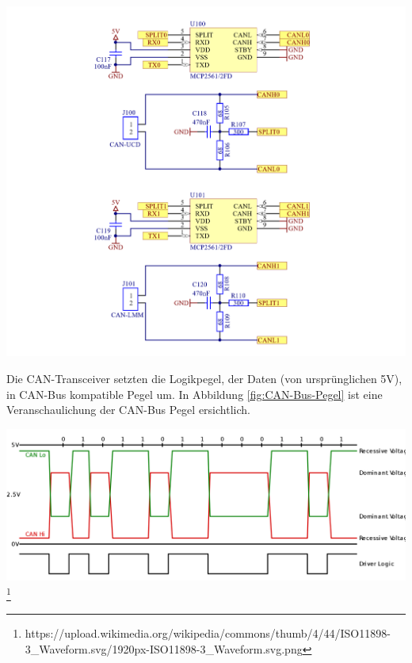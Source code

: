 \documentclass[paper=a4, 12pt]{scrreprt}
\begin{document}
		\begin{adjustbox}{center,caption={CAN-Transceiver},label={fig:CAN-Transceiver},nofloat=figure,vspace=\bigskipamount}
		\includegraphics[width=\textwidth]{img/CAN_Tranceiver.PNG}
		\end{adjustbox}
	Die CAN-Transceiver setzten die Logikpegel, der Daten (von ursprünglichen 5V), in CAN-Bus kompatible Pegel um. In Abbildung \ref{fig:CAN-Bus-Pegel} ist eine Veranschaulichung der CAN-Bus Pegel ersichtlich.
	
	\begin{adjustbox}{center,caption={CAN-Bus Pegelumsetzung},label={fig:CAN-Bus-Pegel},nofloat=figure,vspace=\bigskipamount}
		\includegraphics[width=\textwidth]{img/CAN-Pegelumsetzung.PNG}\footnote{https://upload.wikimedia.org/wikipedia/commons/thumb/4/44/ISO11898-3\_Waveform.svg/1920px-ISO11898-3\_Waveform.svg.png}
	\end{adjustbox}
	\hfill \break
\end{document}

